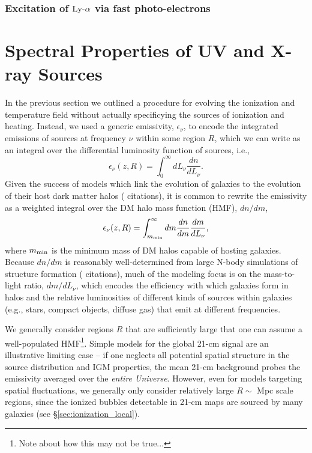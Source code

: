 \subsubsection{Excitation of $\text{Ly-}\alpha$ via fast photo-electrons}

\section{Spectral Properties of UV and X-ray Sources} \label{sec:sources}
In the previous section we outlined a procedure for evolving the ionization and temperature field without actually specificying the sources of ionization and heating. Instead, we used a generic emissivity, $\epsilon_{\nu}$, to encode the integrated emissions of sources at frequency $\nu$ within some region $R$, which we can write as an integral over the differential luminosity function of sources, i.e.,
\begin{equation}
	\epsilon_{\nu}(z,R) = \int_0^{\infty} dL_{\nu} \frac{dn}{dL_{\nu}} .
\end{equation}
Given the success of models which link the evolution of galaxies to the evolution of their host dark matter halos ({\color{red} citations}), it is common to rewrite the emissivity as a weighted integral over the DM halo mass function (HMF), $dn/dm$, 
\begin{equation}
	\epsilon_{\nu}(z,R) = \int_{m_{\text{min}}}^{\infty} dm \frac{dn}{dm} \frac{dm}{d L_{\nu}} ,
\end{equation}
where $m_{\text{min}}$ is the minimum mass of DM halos capable of hosting galaxies. Because $dn/dm$ is reasonably well-determined from large N-body simulations of structure formation ({\color{red} citations}), much of the modeling focus is on the mass-to-light ratio, $dm/dL_{\nu}$, which encodes the efficiency with which galaxies form in halos and the relative luminosities of different kinds of sources within galaxies (e.g., stars, compact objects, diffuse gas) that emit at different frequencies. 

We generally consider regions $R$ that are sufficiently large that one can assume a well-populated HMF\footnote{Note about how this may not be true...}. Simple models for the global 21-cm signal are an illustrative limiting case -- if one neglects all potential spatial structure in the source distribution and IGM properties, the mean 21-cm background probes the emissivity averaged over the \textit{entire Universe}. However, even for models targeting spatial fluctuations, we generally only consider relatively large $R \sim$ Mpc scale regions, since the ionized bubbles detectable in 21-cm maps are sourced by many galaxies (see \S\ref{sec:ionization_local}). 

